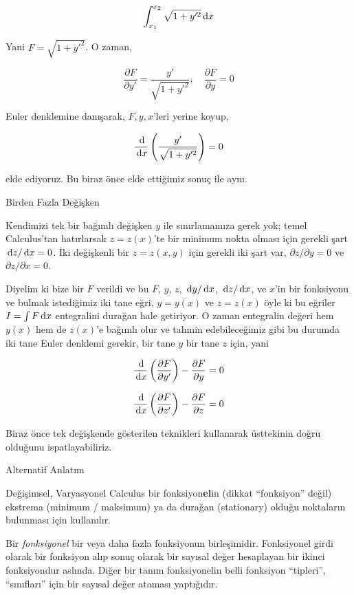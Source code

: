 \documentclass[12pt,fleqn]{article}\usepackage{../../common}
\begin{document}
$$
\int_{x_1}^{x_2} \sqrt{1 + y'^2} \,\mathrm{d} x
$$

Yani $F =  \sqrt{1 + {y'}^2}$. O zaman,

$$
\frac{\partial F}{\partial y'} = \frac{y'}{\sqrt{1 + y'^2}}, \quad
\frac{\partial F}{\partial y} = 0
$$

Euler denklemine danışarak, $F,y,x$'leri yerine koyup,

$$
\frac{\,\mathrm{d}}{\,\mathrm{d} x} \left(
 \frac{y'}{\sqrt{1 + y'^2}}
\right) = 0
$$

elde ediyoruz. Bu biraz önce elde ettiğimiz sonuç ile aynı. 

Birden Fazla Değişken

Kendimizi tek bir bağımlı değişken $y$ ile sınırlamamıza gerek yok; temel
Calculus'tan hatırlarsak $z = z(x)$'te bir minimum nokta olması için
gerekli şart $\,\mathrm{d} z / \,\mathrm{d} x = 0$. İki değişkenli bir $z = z(x,y)$ için
gerekli iki şart var, $\partial z / \partial y = 0$ ve $\partial z
/ \partial x = 0$. 

Diyelim ki bize bir $F$ verildi ve bu $F$, $y$, $z$, $\,\mathrm{d} y / \,\mathrm{d} x$, $\,\mathrm{d} z /
\,\mathrm{d} x$, ve $x$'in bir fonksiyonu ve bulmak istediğimiz iki tane eğri,
$y=y(x)$ ve $z=z(x)$ öyle ki bu eğriler $I = \int F \,\mathrm{d} x$ entegralini
durağan hale getiriyor. O zaman entegralin değeri hem $y(x)$ hem de
$z(x)$'e bağımlı olur ve tahmin edebileceğimiz gibi bu durumda iki tane
Euler denklemi gerekir, bir tane $y$ bir tane $z$ için, yani

$$
\frac{\,\mathrm{d}}{\,\mathrm{d} x} 
  \left( \frac{\partial F}{\partial y'} \right) -
  \frac{\partial F}{\partial y} = 0
$$

$$
\frac{\,\mathrm{d}}{\,\mathrm{d} x} 
  \left( \frac{\partial F}{\partial z'} \right) -
  \frac{\partial F}{\partial z} = 0
$$

Biraz önce tek değişkende gösterilen teknikleri kullanarak üsttekinin doğru
olduğunu ispatlayabiliriz.  



\newpage

Alternatif Anlatım

Değişimsel, Varyasyonel Calculus bir fonksiyon\textbf{el}in (dikkat
``fonksiyon'' değil) ekstrema (minimum / maksimum) ya da durağan
(stationary) olduğu noktaların bulunması için kullanılır.

Bir {\em fonksiyonel} bir veya daha fazla fonksiyonun
birleşimidir. Fonksiyonel girdi olarak bir fonksiyon alıp sonuç olarak
bir sayısal değer hesaplayan bir ikinci fonksiyondur aslında. Diğer
bir tanım fonksiyonelin belli fonksiyon ``tipleri'', ``sınıfları''
için bir sayısal değer ataması yaptığıdır.
\end{document}
